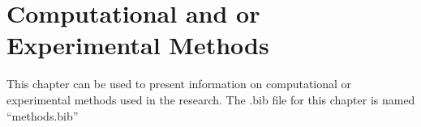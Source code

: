 \chapter{Computational and or Experimental Methods}

This chapter can be used to present information on computational or
experimental methods used in the research. The .bib file for this chapter is
named ``methods.bib''

\singlespacing


\doublespacing
